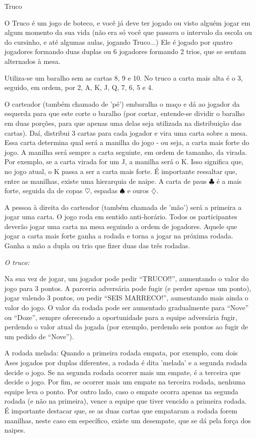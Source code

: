 \begin{subsecao}{Truco}

O Truco é um jogo de boteco, e você já deve ter jogado ou visto alguém jogar em
algum momento da sua vida (não era só você que passava o intervalo da escola ou
do cursinho, e até algumas aulas, jogando Truco...) Ele é jogado por quatro
jogadores formando duas duplas ou 6 jogadores formando 2 trios, que se sentam
alternados à mesa.

Utiliza-se um baralho sem as cartas 8, 9 e 10. No truco a carta mais alta é o 3,
seguido, em ordem, por 2, A, K, J, Q, 7, 6, 5 e 4. 

O carteador (também chamado de 'pé') embaralha o maço e dá ao jogador da
esquerda para que este corte o baralho (por cortar, entende-se dividir o baralho
em duas porções, para que apenas uma delas seja utilizada na distribuição das
cartas). Daí, distribui 3 cartas para cada
jogador e vira uma carta sobre a mesa. Essa carta determina qual será a manilha
do jogo - ou seja, a carta mais forte do jogo. A manilha será sempre a carta
seguinte, em ordem de tamanho, da virada. Por exemplo, se a carta virada for um J,
a manilha será o K. Isso significa que, no jogo atual, o
K passa a ser a carta mais forte. É importante ressaltar que,
entre as manilhas, existe uma hierarquia de naipe. A carta de paus $\clubsuit$ é a mais forte, seguida da de copas $\heartsuit$,
espadas $\spadesuit$ e ouros $\diamondsuit$.

A pessoa à direita do carteador (também chamada de 'mão') será a primeira a
jogar uma carta. O jogo roda em sentido anti-horário. Todos os participantes
deverão jogar uma carta na mesa seguindo a ordem de jogadores. Aquele que jogar
a carta mais forte ganha a rodada e torna a jogar na próxima rodada. Ganha a
mão a dupla ou trio que fizer duas das três rodadas.

\textit{O truco:}

Na sua vez de jogar, um jogador pode pedir ``TRUCO!!'', aumentando o valor do
jogo para 3 pontos. A parceria adversária pode fugir (e perder apenas um
ponto), jogar valendo 3 pontos, ou pedir ``SEIS MARRECO!'', aumentando mais ainda
o valor do jogo. O valor da rodada pode ser aumentado gradualmente para ``Nove''
ou ``Doze'', sempre oferecendo a oportunidade para a equipe adversária fugir,
perdendo o valor atual da jogada (por exemplo, perdendo seis pontos ao fugir de um pedido de ``Nove''). 

A rodada melada: Quando a primeira rodada empata, por exemplo, com dois Ases jogados por
duplas diferentes, a rodada é dita 'melada' e a segunda rodada decide o jogo. Se na segunda
rodada ocorrer mais um empate, é a terceira que decide o jogo. Por fim, se ocorrer mais um
empate na terceira rodada, nenhuma equipe leva o ponto. Por outro lado, caso o empate
ocorra apenas na segunda rodada (e não na primeira), vence a equipe que tiver vencido a primeira
rodada. É importante destacar que, se as duas cartas que empataram a rodada forem manilhas,
neste caso em específico, existe um desempate, que se dá pela força dos naipes. 


\end{subsecao}
